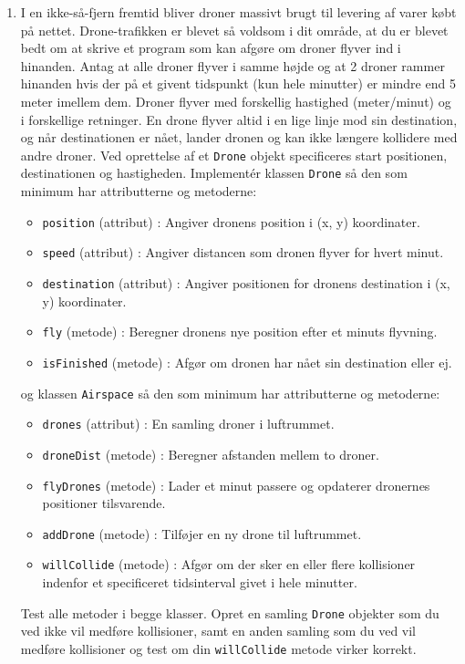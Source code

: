 \documentclass[a4paper,12pt]{article}
\begin{document}
\begin{enumerate}[label=10ø.\arabic*,start=0]
\item I en ikke-så-fjern fremtid bliver droner massivt brugt til levering af varer købt på nettet.  Drone-trafikken er blevet så voldsom i dit område, at du er blevet bedt om at skrive et program som kan afgøre om droner flyver ind i hinanden. Antag at alle droner flyver i samme højde og at 2 droner rammer hinanden hvis der på et givent tidspunkt (kun hele minutter) er mindre end 5 meter imellem dem.  Droner flyver med forskellig hastighed (meter/minut) og i forskellige retninger. En drone flyver altid i en lige linje mod sin destination, og når destinationen er nået, lander dronen og kan ikke længere kollidere med andre droner.  Ved oprettelse af et \texttt{Drone} objekt specificeres start positionen, destinationen og hastigheden.  Implementér klassen \texttt{Drone} så den som minimum har attributterne og metoderne:
    \begin{itemize}
    \item \texttt{position} (attribut) : Angiver dronens position i (x, y) koordinater.
    \item \texttt{speed} (attribut) : Angiver distancen som dronen flyver for hvert minut.
    \item \texttt{destination} (attribut) : Angiver positionen for dronens destination i (x, y) koordinater.
    \item \texttt{fly} (metode) : Beregner dronens nye position efter et minuts flyvning.
    \item \texttt{isFinished} (metode) : Afgør om dronen har nået sin destination eller ej.
    \end{itemize}
    og klassen \texttt{Airspace} så den som minimum har attributterne og metoderne:
    \begin{itemize}
    \item \texttt{drones} (attribut) : En samling droner i luftrummet.
    \item \texttt{droneDist} (metode) : Beregner afstanden mellem to droner.
    \item \texttt{flyDrones} (metode) : Lader et minut passere og opdaterer dronernes positioner tilsvarende.
    \item \texttt{addDrone} (metode) : Tilføjer en ny drone til luftrummet.
    \item \texttt{willCollide} (metode) : Afgør om der sker en eller flere kollisioner indenfor et specificeret tidsinterval givet
      i hele minutter.
    \end{itemize}
    Test alle metoder i begge klasser. Opret en samling \texttt{Drone} objekter som du ved ikke vil medføre kollisioner, samt en anden samling som du ved vil medføre kollisioner og test om din \texttt{willCollide} metode virker korrekt.

\end{enumerate}
\end{document}
